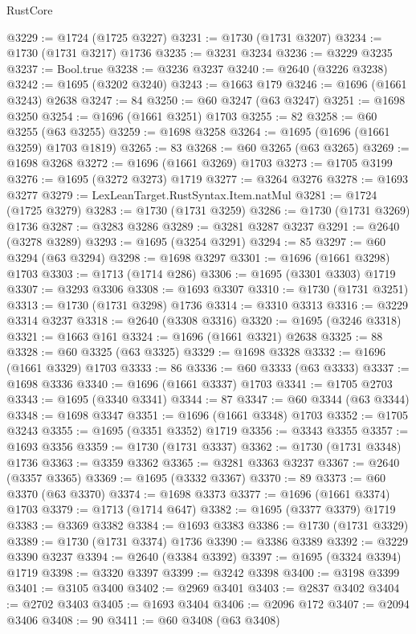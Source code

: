 \begin{lexlean}{RustCore}
\begin{coremodule}
@3229 := @1724 (@1725 @3227)
@3231 := @1730 (@1731 @3207)
@3234 := @1730 (@1731 @3217) @1736
@3235 := @3231 @3234
@3236 := @3229 @3235
@3237 := Bool.true
@3238 := @3236 @3237
@3240 := @2640 (@3226 @3238)
@3242 := @1695 (@3202 @3240)
@3243 := @1663 @179
@3246 := @1696 (@1661 @3243) @2638
@3247 := 84
@3250 := @60 @3247 (@63 @3247)
@3251 := @1698 @3250
@3254 := @1696 (@1661 @3251) @1703
@3255 := 82
@3258 := @60 @3255 (@63 @3255)
@3259 := @1698 @3258
@3264 := @1695 (@1696 (@1661 @3259) @1703 @1819)
@3265 := 83
@3268 := @60 @3265 (@63 @3265)
@3269 := @1698 @3268
@3272 := @1696 (@1661 @3269) @1703
@3273 := @1705 @3199
@3276 := @1695 (@3272 @3273) @1719
@3277 := @3264 @3276
@3278 := @1693 @3277
@3279 := LexLeanTarget.RustSyntax.Item.natMul
@3281 := @1724 (@1725 @3279)
@3283 := @1730 (@1731 @3259)
@3286 := @1730 (@1731 @3269) @1736
@3287 := @3283 @3286
@3289 := @3281 @3287 @3237
@3291 := @2640 (@3278 @3289)
@3293 := @1695 (@3254 @3291)
@3294 := 85
@3297 := @60 @3294 (@63 @3294)
@3298 := @1698 @3297
@3301 := @1696 (@1661 @3298) @1703
@3303 := @1713 (@1714 @286)
@3306 := @1695 (@3301 @3303) @1719
@3307 := @3293 @3306
@3308 := @1693 @3307
@3310 := @1730 (@1731 @3251)
@3313 := @1730 (@1731 @3298) @1736
@3314 := @3310 @3313
@3316 := @3229 @3314 @3237
@3318 := @2640 (@3308 @3316)
@3320 := @1695 (@3246 @3318)
@3321 := @1663 @161
@3324 := @1696 (@1661 @3321) @2638
@3325 := 88
@3328 := @60 @3325 (@63 @3325)
@3329 := @1698 @3328
@3332 := @1696 (@1661 @3329) @1703
@3333 := 86
@3336 := @60 @3333 (@63 @3333)
@3337 := @1698 @3336
@3340 := @1696 (@1661 @3337) @1703
@3341 := @1705 @2703
@3343 := @1695 (@3340 @3341)
@3344 := 87
@3347 := @60 @3344 (@63 @3344)
@3348 := @1698 @3347
@3351 := @1696 (@1661 @3348) @1703
@3352 := @1705 @3243
@3355 := @1695 (@3351 @3352) @1719
@3356 := @3343 @3355
@3357 := @1693 @3356
@3359 := @1730 (@1731 @3337)
@3362 := @1730 (@1731 @3348) @1736
@3363 := @3359 @3362
@3365 := @3281 @3363 @3237
@3367 := @2640 (@3357 @3365)
@3369 := @1695 (@3332 @3367)
@3370 := 89
@3373 := @60 @3370 (@63 @3370)
@3374 := @1698 @3373
@3377 := @1696 (@1661 @3374) @1703
@3379 := @1713 (@1714 @647)
@3382 := @1695 (@3377 @3379) @1719
@3383 := @3369 @3382
@3384 := @1693 @3383
@3386 := @1730 (@1731 @3329)
@3389 := @1730 (@1731 @3374) @1736
@3390 := @3386 @3389
@3392 := @3229 @3390 @3237
@3394 := @2640 (@3384 @3392)
@3397 := @1695 (@3324 @3394) @1719
@3398 := @3320 @3397
@3399 := @3242 @3398
@3400 := @3198 @3399
@3401 := @3105 @3400
@3402 := @2969 @3401
@3403 := @2837 @3402
@3404 := @2702 @3403
@3405 := @1693 @3404
@3406 := @2096 @172
@3407 := @2094 @3406
@3408 := 90
@3411 := @60 @3408 (@63 @3408)

\end{coremodule}
\end{lexlean}
